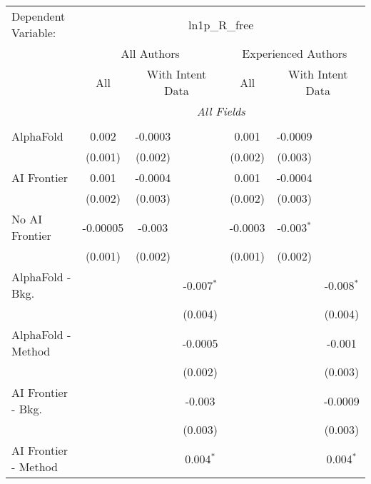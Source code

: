 \begingroup
\centering
\begin{tabular}{lcccccc}
   \tabularnewline \midrule \midrule
   Dependent Variable: & \multicolumn{6}{c}{ln1p\_R\_free}\\
 & \multicolumn{3}{c}{All Authors} & \multicolumn{3}{c}{Experienced Authors} \\
\cmidrule(lr){2-4} \cmidrule(lr){5-7}
 & \multicolumn{1}{c}{All} & \multicolumn{2}{c}{With Intent Data} & \multicolumn{1}{c}{All} & \multicolumn{2}{c}{With Intent Data} \\
\cmidrule(lr){2-2} \cmidrule(lr){3-4} \cmidrule(lr){5-5} \cmidrule(lr){6-7}
 & \multicolumn{6}{c}{\textit{All Fields}} \\ \\
   AlphaFold               & 0.002    & -0.0003 &                & 0.001   & -0.0009      &   \\   
                           & (0.001)  & (0.002) &                & (0.002) & (0.003)      &   \\   
   AI Frontier             & 0.001    & -0.0004 &                & 0.001   & -0.0004      &   \\   
                           & (0.002)  & (0.003) &                & (0.002) & (0.003)      &   \\   
   No AI Frontier          & -0.00005 & -0.003  &                & -0.0003 & -0.003$^{*}$ &   \\   
                           & (0.001)  & (0.002) &                & (0.001) & (0.002)      &   \\   
   AlphaFold - Bkg.        &          &         & -0.007$^{*}$   &         &              & -0.008$^{*}$\\   
                           &          &         & (0.004)        &         &              & (0.004)\\   
   AlphaFold - Method      &          &         & -0.0005        &         &              & -0.001\\   
                           &          &         & (0.002)        &         &              & (0.003)\\   
   AI Frontier - Bkg.      &          &         & -0.003         &         &              & -0.0009\\   
                           &          &         & (0.003)        &         &              & (0.003)\\   
   AI Frontier - Method    &          &         & 0.004$^{*}$    &         &              & 0.004$^{*}$\\   

\end{tabular}
